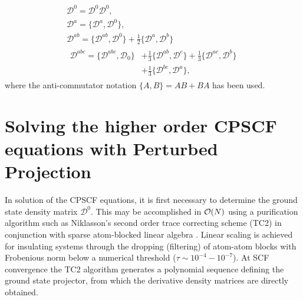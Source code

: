 \documentclass[prl,aps,preprint,showpacs,superbib]{revtex4}
\def\D{\mathcal{D}}
\begin{document}
\begin{gather}
  \D^{0} =\D^{0} \D^{0},\label{eq:anticommutators1}\\
  \D^{a} =\{\D^{a},\D^{0}\},\label{eq:anticommutators2}\\
  \D^{ab}=\{\D^{ab},\D^{0}\}+\frac{1}{2}\{\D^{a},\D^{b}\}\label{eq:anticommutators3}\\
  \begin{split}
    \D^{abc}=\{\D^{abc},\D_0\}&+\frac{1}{3}\{\D^{ab},\D^{c}\}+\frac{1}{3}\{\D^{ac},\D^{b}\}\\
    &+\frac{1}{3}\{\D^{bc},\D^{a}\}\label{eq:anticommutators4},
  \end{split}
\end{gather}
where the anti-commutator notation $\{A,B\} = AB+BA$ has been used.

\section{Solving the higher order CPSCF equations with Perturbed Projection}

In solution of the CPSCF equations, it is first necessary to determine the ground state density matrix $\mathcal{D}^0$.  This may 
be accomplished in ${\cal O}(N)$ using a purification algorithm such as Niklasson's \cite{ANiklasson02A} 
second order trace correcting scheme (TC2) in conjunction with sparse atom-blocked linear algebra 
\cite{ANiklasson03,MChallacombe00B}.  Linear scaling is achieved for insulating systems through 
the dropping (filtering) of atom-atom blocks with Frobenious norm below a numerical threshold 
($\tau \sim 10^{-4}-10^{-7}$).  At SCF convergence the TC2 algorithm generates a polynomial sequence 
defining the ground state projector, from which the derivative density matrices are directly obtained.
\end{document}
